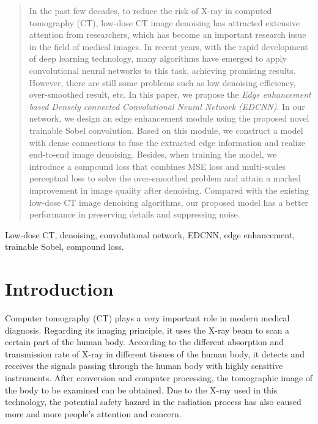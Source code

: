 \documentclass[conference]{IEEEtran}
\begin{document}
    \begin{abstract}
        In the past few decades, to reduce the risk of X-ray in computed tomography (CT), low-dose CT image denoising has attracted extensive attention from researchers, which has become an important research issue in the field of medical images. 
        In recent years, with the rapid development of deep learning technology, many algorithms have emerged to apply convolutional neural networks to this task, achieving promising results.
        However, there are still some problems such as low denoising efficiency, over-smoothed result, etc. 
        In this paper, we propose the \emph{Edge enhancement based Densely connected Convolutional Neural Network (EDCNN)}. 
        In our network, we design an edge enhancement module using the proposed novel trainable Sobel convolution. Based on this module, we construct a model with dense connections to fuse the extracted edge information and realize end-to-end image denoising.
        Besides, when training the model, we introduce a compound loss that combines MSE loss and multi-scales perceptual loss to solve the over-smoothed problem and attain a marked improvement in image quality after denoising.
        Compared with the existing low-dose CT image denoising algorithms, our proposed model has a better performance in preserving details and suppressing noise.
    \end{abstract}

    \bigskip

    \begin{IEEEkeywords}
        Low-dose CT, denoising, convolutional network, EDCNN, edge enhancement, trainable Sobel, compound loss.
    \end{IEEEkeywords}

    \section{Introduction}
        Computer tomography (CT)\cite{buzug_computed_2011} plays a very important role in modern medical diagnosis.
        Regarding its imaging principle, it uses the X-ray beam to scan a certain part of the human body. 
        According to the different absorption and transmission rate of X-ray in different tissues of the human body, it detects and receives the signals passing through the human body with highly sensitive instruments. 
        After conversion and computer processing, the tomographic image of the body to be examined can be obtained.
        Due to the X-ray used in this technology, the potential safety hazard in the radiation process has also caused more and more people's attention and concern\cite{brody_radiation_2007,donya_radiation_2014,10.1001/archinternmed.2009.427,hobbs_physician_2018}.
        
\end{document}
